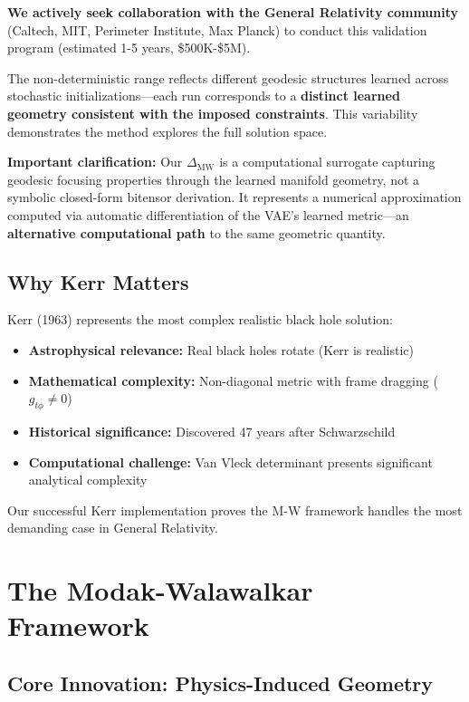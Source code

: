\documentclass[11pt,a4paper]{article}
\begin{document}
\textbf{We actively seek collaboration with the General Relativity community} (Caltech, MIT, Perimeter Institute, Max Planck) to conduct this validation program (estimated 1-5 years, \$500K-\$5M).

The non-deterministic range reflects different geodesic structures learned across stochastic initializations—each run corresponds to a \textbf{distinct learned geometry consistent with the imposed constraints}. This variability demonstrates the method explores the full solution space.

\textbf{Important clarification:} Our $\Delta_{\text{MW}}$ is a computational surrogate capturing geodesic focusing properties through the learned manifold geometry, not a symbolic closed-form bitensor derivation. It represents a numerical approximation computed via automatic differentiation of the VAE's learned metric—an \textbf{alternative computational path} to the same geometric quantity.

\subsection{Why Kerr Matters}

Kerr (1963) represents the most complex realistic black hole solution:

\begin{itemize}
\item \textbf{Astrophysical relevance:} Real black holes rotate (Kerr is realistic)
\item \textbf{Mathematical complexity:} Non-diagonal metric with frame dragging ($g_{t\phi} \neq 0$)
\item \textbf{Historical significance:} Discovered 47 years after Schwarzschild
\item \textbf{Computational challenge:} Van Vleck determinant presents significant analytical complexity
\end{itemize}

Our successful Kerr implementation proves the M-W framework handles the most demanding case in General Relativity.

\section{The Modak-Walawalkar Framework}

\subsection{Core Innovation: Physics-Induced Geometry}
\end{document}
